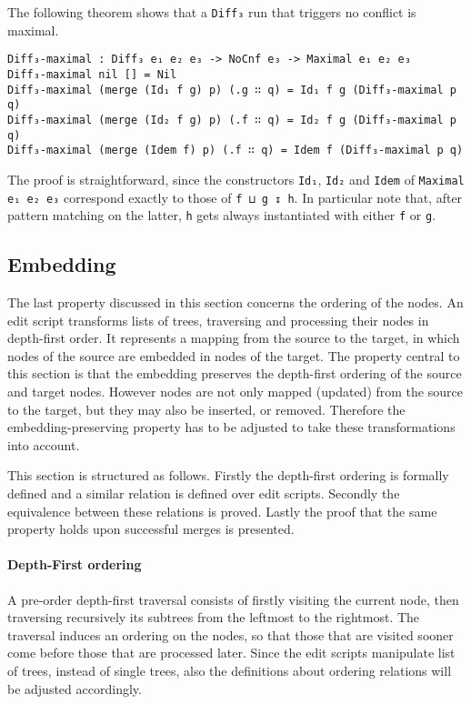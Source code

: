 \documentclass[../Thesis.tex]{subfiles}
\begin{document}
	The following theorem shows that a \texttt{Diff₃} run that triggers no
	conflict is maximal.
	
\begin{verbatim}
Diff₃-maximal : Diff₃ e₁ e₂ e₃ -> NoCnf e₃ -> Maximal e₁ e₂ e₃
Diff₃-maximal nil [] = Nil
Diff₃-maximal (merge (Id₁ f g) p) (.g ∷ q) = Id₁ f g (Diff₃-maximal p q)
Diff₃-maximal (merge (Id₂ f g) p) (.f ∷ q) = Id₂ f g (Diff₃-maximal p q)
Diff₃-maximal (merge (Idem f) p) (.f ∷ q) = Idem f (Diff₃-maximal p q)
\end{verbatim}
	
	The proof is straightforward, since the constructors \texttt{Id₁}, \texttt{Id₂} 
	and \texttt{Idem} of \texttt{Maximal e₁ e₂ e₃} correspond exactly to those
	of \texttt{f ⊔ g ↧ h}.
	In particular note that, after pattern matching on the latter, \texttt{h} gets
	always instantiated with either \texttt{f} or \texttt{g}.
		
	\subsection{Embedding}
	\label{subsec:Embedding}
	The last property discussed in this section concerns the ordering of 
	the nodes. An edit script transforms lists of trees, traversing and processing 
	their nodes in depth-first order.
	It represents a mapping from the source to the target, in which 
	nodes of the source are embedded in nodes of the target.
	The property central to this section is that the 
	embedding preserves the depth-first ordering of the 
	source and target nodes.
	However nodes are not only mapped (updated) from the source to the 
	target, but they may also be inserted, or removed. 
	Therefore the embedding-preserving property has to be adjusted to
	take these transformations into account.
	
	This section is structured as follows. Firstly the depth-first ordering
	is formally defined and a similar relation is defined over
	edit scripts. Secondly the equivalence 
	between these relations is proved. Lastly the proof that the same 
	property holds upon successful merges is presented.
	
	\paragraph{Depth-First ordering}
	A pre-order depth-first traversal consists of
	firstly visiting the current node, then traversing recursively its subtrees 	
	from the leftmost to the rightmost.
	The traversal induces an ordering on the nodes, so that those that
	are visited sooner come before those that are processed later.
	Since the edit scripts manipulate list of trees, instead of single trees,
	also the definitions about ordering relations will be adjusted accordingly.
\end{document}
